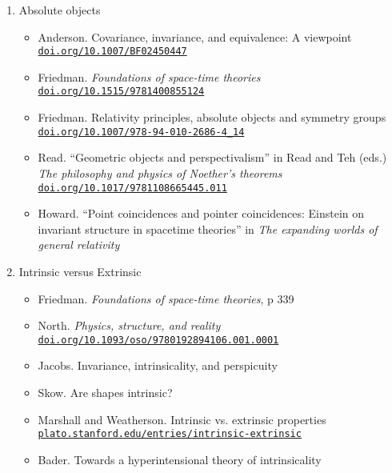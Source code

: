 \documentclass[11pt]{article}
\newcommand\rurl[1]{%
  \href{http://#1}{\nolinkurl{#1}}%
}
\begin{document}
\begin{enumerate}
\item Absolute objects
  \begin{itemize}
  \item Anderson. Covariance, invariance, and equivalence: A
    viewpoint \rurl{doi.org/10.1007/BF02450447}
  \item Friedman. \emph{Foundations of space-time theories}
    \rurl{doi.org/10.1515/9781400855124}
  \item Friedman. Relativity principles, absolute objects and symmetry
    groups \rurl{doi.org/10.1007/978-94-010-2686-4_14}
  \item Read. ``Geometric objects and perspectivalism'' in Read and
    Teh (eds.) \textit{The philosophy and physics of Noether's
      theorems} \rurl{doi.org/10.1017/9781108665445.011}
  \item Howard. ``Point coincidences and pointer coincidences:
    Einstein on invariant structure in spacetime theories'' in
    \textit{The expanding worlds of general relativity}
  \end{itemize}

\item Intrinsic versus Extrinsic
  \begin{itemize}
  \item Friedman. \textit{Foundations of space-time theories}, p 339
  \item North. \emph{Physics, structure, and reality}
    \rurl{doi.org/10.1093/oso/9780192894106.001.0001}
  \item Jacobs. Invariance, intrinsicality, and perspicuity
  \item Skow. Are shapes intrinsic? 
  \item Marshall and Weatherson. Intrinsic vs. extrinsic properties
    \rurl{plato.stanford.edu/entries/intrinsic-extrinsic}
  \item Bader. Towards a hyperintensional theory of intrinsicality
  \end{itemize}


\end{enumerate}
\end{document}
